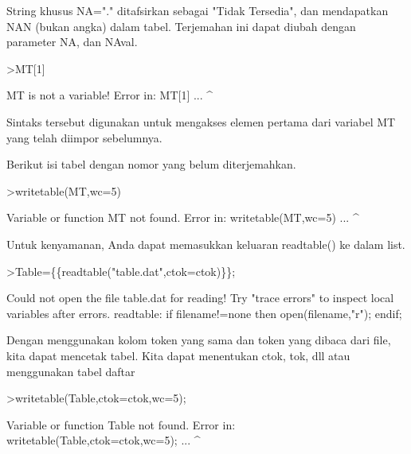 \documentclass[a4paper,10pt]{article}
\begin{document}
\begin{eulernotebook}
\begin{eulercomment}
\begin{eulercomment}
\begin{eulercomment}
\begin{eulercomment}
\begin{eulercomment}
\begin{eulercomment}
\begin{eulercomment}
\begin{eulercomment}
\begin{eulercomment}
\begin{eulercomment}
\begin{eulercomment}
\begin{eulercomment}
\begin{eulercomment}
\begin{eulercomment}
\begin{eulercomment}
\begin{eulercomment}
\begin{eulercomment}
\begin{eulercomment}
\begin{eulercomment}
String khusus NA="." ditafsirkan sebagai "Tidak Tersedia", dan
mendapatkan NAN (bukan angka) dalam tabel. Terjemahan ini dapat diubah
dengan parameter NA, dan NAval.
\end{eulercomment}
\begin{eulerprompt}
>MT[1]
\end{eulerprompt}
\begin{euleroutput}
  MT is not a variable!
  Error in:
  MT[1] ...
       ^
\end{euleroutput}
\begin{eulercomment}
Sintaks tersebut digunakan untuk mengakses elemen pertama dari
variabel MT yang telah diimpor sebelumnya.

Berikut isi tabel dengan nomor yang belum diterjemahkan.
\end{eulercomment}
\begin{eulerprompt}
>writetable(MT,wc=5)
\end{eulerprompt}
\begin{euleroutput}
  Variable or function MT not found.
  Error in:
  writetable(MT,wc=5) ...
               ^
\end{euleroutput}
\begin{eulercomment}
Untuk kenyamanan, Anda dapat memasukkan keluaran readtable() ke dalam
list.
\end{eulercomment}
\begin{eulerprompt}
>Table=\{\{readtable("table.dat",ctok=ctok)\}\};
\end{eulerprompt}
\begin{euleroutput}
  Could not open the file
  table.dat
  for reading!
  Try "trace errors" to inspect local variables after errors.
  readtable:
      if filename!=none then open(filename,"r"); endif;
\end{euleroutput}
\begin{eulercomment}
Dengan menggunakan kolom token yang sama dan token yang dibaca dari
file, kita dapat mencetak tabel. Kita dapat menentukan ctok, tok, dll
atau menggunakan tabel daftar
\end{eulercomment}
\begin{eulerprompt}
>writetable(Table,ctok=ctok,wc=5);
\end{eulerprompt}
\begin{euleroutput}
  Variable or function Table not found.
  Error in:
  writetable(Table,ctok=ctok,wc=5); ...
                  ^
\end{euleroutput}
\begin{eulercomment}

\end{eulercomment}
\end{eulercomment}
\end{eulercomment}
\end{eulercomment}
\end{eulercomment}
\end{eulercomment}
\end{eulercomment}
\end{eulercomment}
\end{eulercomment}
\end{eulercomment}
\end{eulercomment}
\end{eulercomment}
\end{eulercomment}
\end{eulercomment}
\end{eulercomment}
\end{eulercomment}
\end{eulercomment}
\end{eulercomment}
\end{eulercomment}
\end{eulernotebook}
\end{document}
